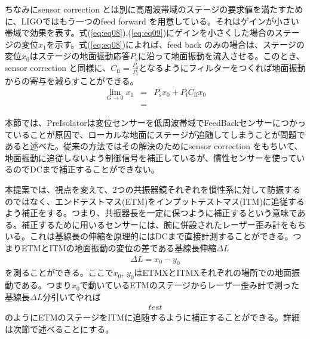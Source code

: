 ちなみにsensor correction とは別に高周波帯域のステージの要求値を満たすために、LIGOではもう一つのfeed forward を用意している。それはゲインが小さい帯域で効果を表す。式(\ref{eq:eq08}),(\ref{eq:eq09})にゲインを小さくした場合のステージの変位$x_1$を示す。式(\ref{eq:eq08})によれば、feed back のみの場合は、ステージの変位$x_0$はステージの地面振動応答$P_{\mathrm{s}}$に沿って地面振動を流入させる。このとき、sensor correction と同様に、$C_{\mathrm{ff}}=\frac{P_{\mathrm{s}}}{P_{\mathrm{f}}}$となるようにフィルターをつくれば地面振動からの寄与を減らすことができる。
\begin{eqnarray}\label{eq:eq08}
  \lim_{G \to 0} x_{1} &=& P_{\mathrm{s}}x_0 + P_{\mathrm{f}}C_{\mathrm{ff}}x_0 \\
  &=& 
\end{eqnarray}


本節では、PreIsolatorは変位センサーを低周波帯域でFeedBackセンサーにつかっていることが原因で、ローカルな地面にステージが追随してしまうことが問題であると述べた。従来の方法ではその解決のためにsensor correction をもちいて、地面振動に追従しないよう制御信号を補正しているが、慣性センサーを使っているのでDCまで補正することができない。

本提案では、視点を変えて、2つの共振器鏡それぞれを慣性系に対して防振するのではなく、エンドテストマス(ETM)をインプットテストマス(ITM)に追従するよう補正をする。つまり、共振器長を一定に保つように補正するという意味である。補正するために用いるセンサーには、腕に併設されたレーザー歪み計をもちいる。これは基線長の伸縮を原理的にはDCまで直接計測することができる。つまりETMとITMの地面振動の変位の差である基線長伸縮$\Delta{L}$
\begin{eqnarray}
  \Delta{L} = x_0-y_0
\end{eqnarray}
を測ることができる。ここで$x_0,\,y_0$はETMXとITMXそれぞれの場所での地面振動である。つまり$x_0$で動いているETMのステージからレーザー歪み計で測った基線長$\Delta{L}$分引いてやれば
\begin{eqnarray}
  test
\end{eqnarray}
のようにETMのステージをITMに追随するように補正することができる。詳細は次節で述べることにする。






